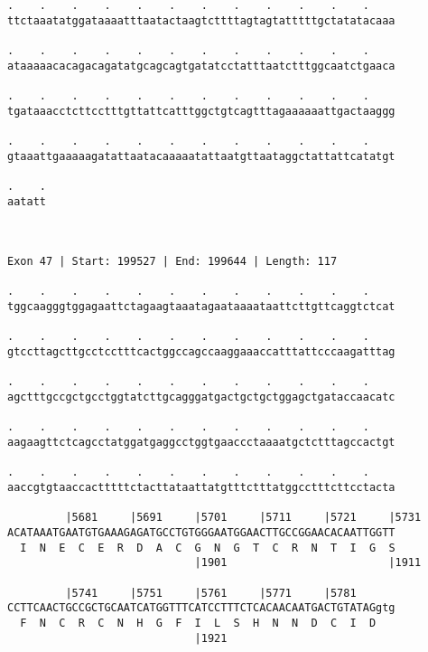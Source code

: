 \documentclass{article}
\begin{document}
\begin{Verbatim}
.    .    .    .    .    .    .    .    .    .    .    .    
ttctaaatatggataaaatttaatactaagtcttttagtagtatttttgctatatacaaa
                                                            
.    .    .    .    .    .    .    .    .    .    .    .    
ataaaaacacagacagatatgcagcagtgatatcctatttaatctttggcaatctgaaca
                                                            
.    .    .    .    .    .    .    .    .    .    .    .    
tgataaacctcttcctttgttattcatttggctgtcagtttagaaaaaattgactaaggg
                                                            
.    .    .    .    .    .    .    .    .    .    .    .    
gtaaattgaaaaagatattaatacaaaaatattaatgttaataggctattattcatatgt
                                                            
.    .
aatatt
      
      
 
Exon 47 | Start: 199527 | End: 199644 | Length: 117
 
.    .    .    .    .    .    .    .    .    .    .    .    
tggcaagggtggagaattctagaagtaaatagaataaaataattcttgttcaggtctcat
                                                            
.    .    .    .    .    .    .    .    .    .    .    .    
gtccttagcttgcctcctttcactggccagccaaggaaaccatttattcccaagatttag
                                                            
.    .    .    .    .    .    .    .    .    .    .    .    
agctttgccgctgcctggtatcttgcagggatgactgctgctggagctgataccaacatc
                                                            
.    .    .    .    .    .    .    .    .    .    .    .    
aagaagttctcagcctatggatgaggcctggtgaaccctaaaatgctctttagccactgt
                                                            
.    .    .    .    .    .    .    .    .    .    .    .    
aaccgtgtaaccactttttctacttataattatgtttctttatggcctttcttcctacta
                                                            
         |5681     |5691     |5701     |5711     |5721     |5731
ACATAAATGAATGTGAAAGAGATGCCTGTGGGAATGGAACTTGCCGGAACACAATTGGTT
  I  N  E  C  E  R  D  A  C  G  N  G  T  C  R  N  T  I  G  S
                             |1901                         |1911
  
         |5741     |5751     |5761     |5771     |5781      
CCTTCAACTGCCGCTGCAATCATGGTTTCATCCTTTCTCACAACAATGACTGTATAGgtg
  F  N  C  R  C  N  H  G  F  I  L  S  H  N  N  D  C  I  D   
                             |1921                          
  

\end{Verbatim}
\end{document}
